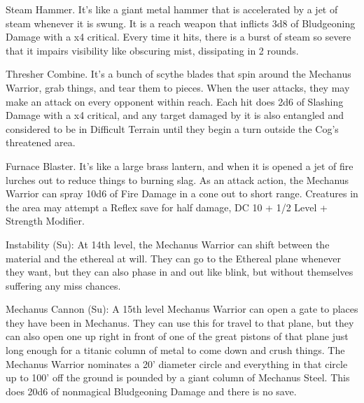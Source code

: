     Steam Hammer. It's like a giant metal hammer that is accelerated by a jet of steam whenever it is swung. It is a reach weapon that inflicts 3d8 of Bludgeoning Damage with a x4 critical. Every time it hits, there is a burst of steam so severe that it impairs visibility like obscuring mist, dissipating in 2 rounds.

    Thresher Combine. It's a bunch of scythe blades that spin around the Mechanus Warrior, grab things, and tear them to pieces. When the user attacks, they may make an attack on every opponent within reach. Each hit does 2d6 of Slashing Damage with a x4 critical, and any target damaged by it is also entangled and considered to be in Difficult Terrain until they begin a turn outside the Cog's threatened area.

    Furnace Blaster. It's like a large brass lantern, and when it is opened a jet of fire lurches out to reduce things to burning slag. As an attack action, the Mechanus Warrior can spray 10d6 of Fire Damage in a cone out to short range. Creatures in the area may attempt a Reflex save for half damage, DC 10 + 1/2 Level + Strength Modifier.



Instability (Su): At 14th level, the Mechanus Warrior can shift between the material and the ethereal at will. They can go to the Ethereal plane whenever they want, but they can also phase in and out like blink, but without themselves suffering any miss chances.

Mechanus Cannon (Su): A 15th level Mechanus Warrior can open a gate to places they have been in Mechanus. They can use this for travel to that plane, but they can also open one up right in front of one of the great pistons of that plane just long enough for a titanic column of metal to come down and crush things. The Mechanus Warrior nominates a 20' diameter circle and everything in that circle up to 100' off the ground is pounded by a giant column of Mechanus Steel. This does 20d6 of nonmagical Bludgeoning Damage and there is no save.
